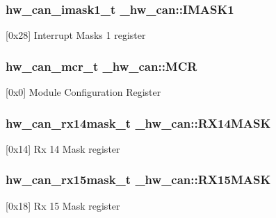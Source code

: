 \subsubsection[{\texorpdfstring{I\+M\+A\+S\+K1}{IMASK1}}]{ {\bf hw\+\_\+can\+\_\+imask1\+\_\+t} \+\_\+hw\+\_\+can\+::\+I\+M\+A\+S\+K1}\hypertarget{struct__hw__can_a82c7182b4e5273fd311cb72644d9ac94}{}\label{struct__hw__can_a82c7182b4e5273fd311cb72644d9ac94}
\mbox{[}0x28\mbox{]} Interrupt Masks 1 register 
\subsubsection[{\texorpdfstring{M\+CR}{MCR}}]{ {\bf hw\+\_\+can\+\_\+mcr\+\_\+t} \+\_\+hw\+\_\+can\+::\+M\+CR}\hypertarget{struct__hw__can_ad345bf7f830189a8931ef7a35e3c4c84}{}\label{struct__hw__can_ad345bf7f830189a8931ef7a35e3c4c84}
\mbox{[}0x0\mbox{]} Module Configuration Register 
\subsubsection[{\texorpdfstring{R\+X14\+M\+A\+SK}{RX14MASK}}]{ {\bf hw\+\_\+can\+\_\+rx14mask\+\_\+t} \+\_\+hw\+\_\+can\+::\+R\+X14\+M\+A\+SK}\hypertarget{struct__hw__can_a9be3a3a467663dc359125148354404f1}{}\label{struct__hw__can_a9be3a3a467663dc359125148354404f1}
\mbox{[}0x14\mbox{]} Rx 14 Mask register 
\subsubsection[{\texorpdfstring{R\+X15\+M\+A\+SK}{RX15MASK}}]{ {\bf hw\+\_\+can\+\_\+rx15mask\+\_\+t} \+\_\+hw\+\_\+can\+::\+R\+X15\+M\+A\+SK}\hypertarget{struct__hw__can_a9c157ca25aa15a09c73fd71084f92308}{}\label{struct__hw__can_a9c157ca25aa15a09c73fd71084f92308}
\mbox{[}0x18\mbox{]} Rx 15 Mask register 
